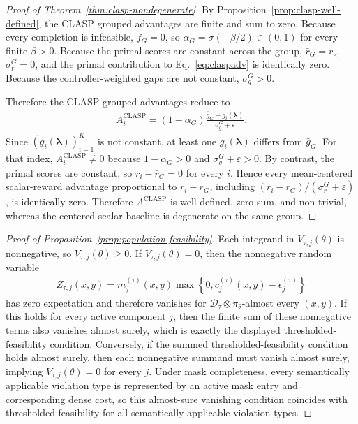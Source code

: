\documentclass{article}
\theoremstyle{remark}
\begin{document}
\begin{proof}[Proof of Theorem~\ref{thm:clasp-nondegenerate}]
By Proposition~\ref{prop:clasp-well-defined}, the CLASP grouped advantages are finite and sum to zero. Because every completion is infeasible, \(f_G=0\), so \(\alpha_G=\sigma(-\beta/2)\in(0,1)\) for every finite \(\beta>0\). Because the primal scores are constant across the group, \(\bar r_G=r_\circ\), \(\sigma_r^G=0\), and the primal contribution to Eq.~\eqref{eq:claspadv} is identically zero. Because the controller-weighted gaps are not constant, \(\sigma_g^G>0\).

Therefore the CLASP grouped advantages reduce to
\begin{align}
A_i^{\mathrm{CLASP}}
=
(1-\alpha_G)
\frac{\bar g_G-g_i(\boldsymbol{\lambda})}{\sigma_g^G+\varepsilon}.
\end{align}
Since \((g_i(\boldsymbol{\lambda}))_{i=1}^K\) is not constant, at least one \(g_i(\boldsymbol{\lambda})\) differs from \(\bar g_G\). For that index, \(A_i^{\mathrm{CLASP}}\neq 0\) because \(1-\alpha_G>0\) and \(\sigma_g^G+\varepsilon>0\). By contrast, the primal scores are constant, so \(r_i-\bar r_G=0\) for every \(i\). Hence every mean-centered scalar-reward advantage proportional to \(r_i-\bar r_G\), including \((r_i-\bar r_G)/(\sigma_r^G+\varepsilon)\), is identically zero. Therefore \(A^{\mathrm{CLASP}}\) is well-defined, zero-sum, and non-trivial, whereas the centered scalar baseline is degenerate on the same group.
\end{proof}

\begin{proof}[Proof of Proposition~\ref{prop:population-feasibility}]
Each integrand in \(V_{\tau,j}(\theta)\) is nonnegative, so \(V_{\tau,j}(\theta)\ge 0\). If \(V_{\tau,j}(\theta)=0\), then the nonnegative random variable
\begin{align}
Z_{\tau,j}(x,y)=m_j^{(\tau)}(x,y)\max\!\left\{0,c_j^{(\tau)}(x,y)-\epsilon_j^{(\tau)}\right\}
\end{align}
has zero expectation and therefore vanishes for \(\mathcal D_\tau\otimes\pi_\theta\)-almost every \((x,y)\). If this holds for every active component \(j\), then the finite sum of these nonnegative terms also vanishes almost surely, which is exactly the displayed thresholded-feasibility condition. Conversely, if the summed thresholded-feasibility condition holds almost surely, then each nonnegative summand must vanish almost surely, implying \(V_{\tau,j}(\theta)=0\) for every \(j\). Under mask completeness, every semantically applicable violation type is represented by an active mask entry and corresponding dense cost, so this almost-sure vanishing condition coincides with thresholded feasibility for all semantically applicable violation types.
\end{proof}
\end{document}

